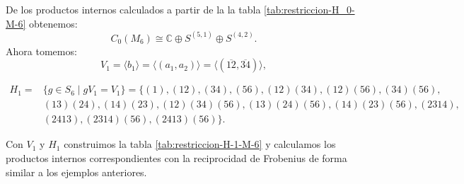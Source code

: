 \documentclass[12pt]{book}
\theoremstyle{definition}
\newcounter{in}
\begin{document}
  De los productos internos calculados a partir de la la tabla
  \ref{tab:restriccion-H_0-M-6} obtenemos:
  \begin{equation}
    C_{0}(M_{6})\cong \mathbb{C}\oplus S^{(5,1)}\oplus S^{(4,2)}.
    \label{C0-M6}
  \end{equation}
  Ahora tomemos:
  \begin{equation*}
    V_{1}=\langle b_{1}\rangle =\langle
    (a_{1},a_{2})\rangle=\langle(\overline{12},\overline{34})\rangle,
  \end{equation*}
  \begin{small}
    \begin{align*}
      H_{1}=&\{g \in S_{6}\mid
      gV_{1}=V_{1}\}=\{(1),(12),(34),(56),(12)(34),(12)(56),(34)(56),\\
      &(13)(24),(14)(23),(12)(34)(56),(13)(24)(56),(14)(23)(56),(2314),\\
      &(2413),(2314)(56),(2413)(56)\}.
    \end{align*}
  \end{small}
  Con $V_{1}$ y $H_{1}$ construimos la tabla
  \ref{tab:restriccion-H-1-M-6} y calculamos los productos internos
  correspondientes con la reciprocidad de Frobenius de forma similar a los ejemplos anteriores.
  
\end{document}
